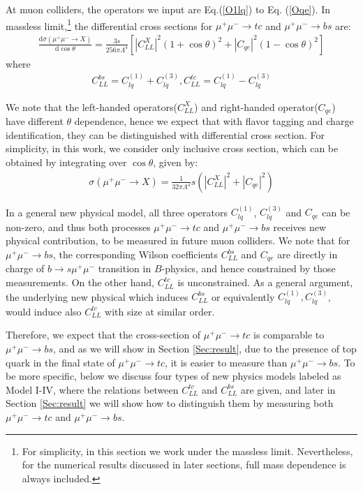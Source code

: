 \documentclass[a4paper,11pt]{article}
\newcommand{\ud}{\mathrm{d}}
\begin{document}
At muon colliders, the operators we input are Eq.(\ref{O1lq}) to Eq. (\ref{Oqe}).
 In massless limit,\footnote{For simplicity, in this section we work under the massless limit. Nevertheless, for the numerical results discussed in later sections, full mass dependence is always included.} the differential cross sections for $\mu^+\mu^-\to tc$ and  $\mu^+\mu^-\to bs$ are:
 \begin{align}
     \frac{\ud\sigma(\mu^+\mu^-\to X)}{\ud\cos\theta}=\frac{3s}{256\pi \Lambda^4}\left[|C_{LL}^{X}|^2(1+\cos\theta)^2+|C_{qe}|^2(1-\cos\theta)^2\right]
 \end{align}
 where
 \begin{align}
 C_{LL}^{bs}=C_{lq}^{(1)}+C_{lq}^{(3)},C_{LL}^{tc}=C_{lq}^{(1)}-C_{lq}^{(3)}
 \end{align}

We note that the left-handed operators($C_{LL}^{X}$) and right-handed operator($C_{qe}$) have different $\theta$ dependence, hence we expect that with flavor tagging and charge identification, they can be distinguished with differential cross section.
For simplicity, in this work, we consider only inclusive cross section, which can be obtained by integrating over $\cos\theta$, given by:
\begin{align}
    \sigma(\mu^+\mu^-\to X)=\frac{1}{32\pi\Lambda^4}s(|C_{LL}^{X}|^2+|C_{qe}|^2)
\end{align}

In a general new physical model,
all three operators $C_{lq}^{(1)}$, $C_{lq}^{(3)}$ and $C_{qe}$ can be non-zero,
and thus both processes $\mu^+\mu^-\to tc$ and $\mu^+\mu^-\to bs$ receives new physical contribution,
to be measured in future muon colliders.
We note that for $\mu^+\mu^-\to bs$, the corresponding Wilson coefficients $C_{LL}^{bs}$ and $C_{qe}$ are directly in charge of $b\to s\mu^+\mu^-$ transition in $B$-physics,
and hence constrained by those measurements.
On the other hand, $C_{LL}^{tc}$ is unconstrained.
As a general argument, the underlying new physical which induces $C_{LL}^{bs}$ or equivalently $C_{lq}^{(1)},C_{lq}^{(3)}$,
would induce also $C_{LL}^{tc}$ with size at similar order.

Therefore, we expect that the cross-section of $\mu^+\mu^-\to tc$ is comparable to $\mu^+\mu^-\to bs$,
and as we will show in Section \ref{Sec:result}, due to the presence of top quark in the final state of $\mu^+\mu^-\to tc$,
it is easier to measure than $\mu^+\mu^-\to bs$.
To be more specific, below we discuss four types of new physics models labeled as Model I-IV, 
where the relations between $C_{LL}^{tc}$ and $C_{LL}^{bs}$ are given,
and later in Section \ref{Sec:result} we will show how to distinguish them by measuring both $\mu^+\mu^-\to tc$ and $\mu^+\mu^-\to bs$.
\end{document}
